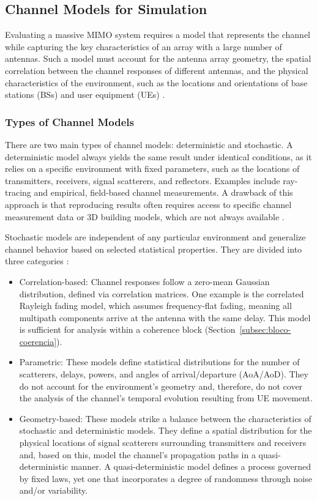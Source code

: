 \subsection{Channel Models for Simulation}
\label{sec:modelo-canal}
Evaluating a massive MIMO system requires a model that represents the channel while capturing the key characteristics of an array with a large number of antennas. Such a model must account for the antenna array geometry, the spatial correlation between the channel responses of different antennas, and the physical characteristics of the environment, such as the locations and orientations of base stations (BSs) and user equipment (UEs) \cite{bjornson-mimo}.

\subsubsection{Types of Channel Models}
There are two main types of channel models: deterministic and stochastic. A deterministic model always yields the same result under identical conditions, as it relies on a specific environment with fixed parameters, such as the locations of transmitters, receivers, signal scatterers, and reflectors. Examples include ray-tracing and empirical, field-based channel measurements. A drawback of this approach is that reproducing results often requires access to specific channel measurement data or 3D building models, which are not always available \cite{bjornson-mimo}.

Stochastic models are independent of any particular environment and generalize channel behavior based on selected statistical properties. They are divided into three categories \cite{bjornson-mimo}:

\begin{itemize}
\item Correlation-based: Channel responses follow a zero-mean Gaussian distribution, defined via correlation matrices. One example is the correlated Rayleigh fading model, which assumes frequency-flat fading, meaning all multipath components arrive at the antenna with the same delay. This model is sufficient for analysis within a coherence block (Section~\ref{subsec:bloco-coerencia}). 
\item Parametric: These models define statistical distributions for the number of scatterers, delays, powers, and angles of arrival/departure (AoA/AoD). They do not account for the environment's geometry and, therefore, do not cover the analysis of the channel's temporal evolution resulting from UE movement. 
\item Geometry-based: These models strike a balance between the characteristics of stochastic and deterministic models. They define a spatial distribution for the physical locations of signal scatterers surrounding transmitters and receivers and, based on this, model the channel's propagation paths in a quasi-deterministic manner. A quasi-deterministic model defines a process governed by fixed laws, yet one that incorporates a degree of randomness through noise and/or variability.
\end{itemize}

